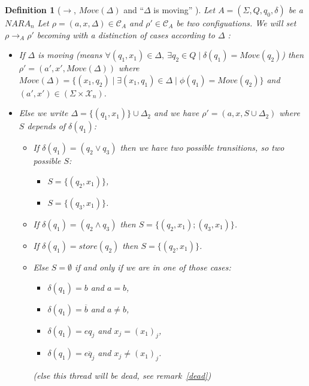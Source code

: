 \documentclass[a4paper,10pt]{report}
\newtheorem{df}{Definition}
\newcommand{\C}{\mathcal{C}_{A}}
\newcommand{\X}{\mathcal{X}_{n}}
\begin{document}
\begin{df}[$\rightarrow$, $Move(\Delta)$ and ``$\Delta$ is moving'' ]
  Let $A = (\Sigma ,Q ,q_0, \delta )$ be a $NARA_n$
  Let $\rho = (a,x,\Delta) \in \C$ and $\rho' \in \C$ be two configuations.
  We will set  $\rho \rightarrow_A \rho'$  becoming with a distinction of cases according to $\Delta$ : 
   \begin{itemize}
    \item [${\xrightarrow{(a',x')}}_M$ (move)] If $\Delta$ is moving (means $\forall (q_1,x_1) \in \Delta, \ \exists q_2 \in Q \mid \delta(q_1) = Move(q_2)$)
    then $\rho'  = (a',x',Move(\Delta))$ 
    where $Move(\Delta) = \{(x_1,q_2) \mid \exists (x_1,q_1) \in \Delta \mid \phi(q_1) = Move(q_2)\}$ and $(a',x') \in (\Sigma \times \X)$.

    \item [$\rightarrow_{\epsilon}$ (epsilon)  ] Else we write $\Delta = \{(q_1,x_1)\} \cup \Delta_2$ and we have  $\rho' = (a,x,S \cup \Delta_2 )$ where $S$ depends of $\delta(q_1)$:  
    \begin{itemize}
    \item [$\rightarrow_\vee$ (or)] If $\delta(q_1) = (q_2 \vee q_3)$  then we have two possible transitions, so two possible $S$:
      \begin{itemize}
	\item $S = \{ (q_2,x_1)\}$,   
	\item $S = \{(q_3,x_1) \}$.
      \end{itemize}
    \item [$\rightarrow_\wedge$ (and)] If $\delta(q_1) = (q_2 \wedge q_3)$  then $S = \{(q_2,x_1); (q_3,x_1) \} $.
    \item [$\rightarrow_s$ (store)] If $\delta(q_1) = store(q_2)$  then $S =  \{(q_2,x_1)\}$.
 
    \item [$\rightarrow_c$ (check)] Else $S = \emptyset$ if and only if we are in one of those cases:  
	\begin{itemize}
 	 \item $\delta(q_1) = b$ and $ a= b$,
 	 \item $\delta(q_1) = \overline b$ and $ a \neq b$,
 	 \item $\delta(q_1) = eq_j$ and $x_j = {(x_1)}_j$,
 	 \item $\delta(q_1) = \overline{eq_j}$ and $x_j \neq {(x_1)}_j$.
	\end{itemize}
	 (else this thread will be dead, see remark~\ref{dead})
    \end{itemize}
   

    
   \end{itemize}


\end{df}
\end{document}
